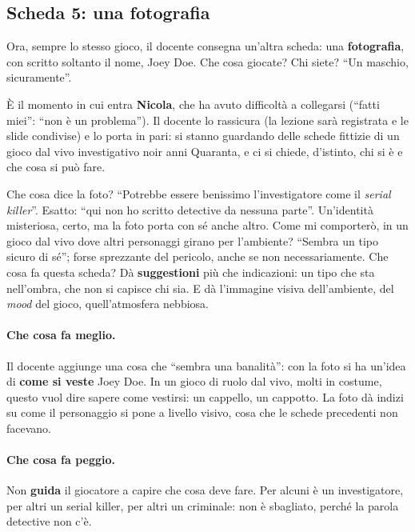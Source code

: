 \subsection{Scheda 5: una fotografia}



Ora, sempre lo stesso gioco, il docente consegna un'altra scheda: una
\textbf{fotografia}, con scritto soltanto il nome, Joey Doe. Che cosa giocate? Chi
siete? ``Un maschio, sicuramente''.

È il momento in cui entra \textbf{Nicola}, che ha avuto difficoltà a collegarsi
(``fatti miei'': ``non è un problema''). Il docente lo rassicura (la lezione sarà
registrata e le slide condivise) e lo porta in pari: si stanno guardando delle
schede fittizie di un gioco dal vivo investigativo noir anni Quaranta, e ci si
chiede, d'istinto, chi si è e che cosa si può fare.

Che cosa dice la foto? ``Potrebbe essere benissimo l'investigatore come il
\emph{serial killer}''. Esatto: ``qui non ho scritto detective da nessuna parte''.
Un'identità misteriosa, certo, ma la foto porta con sé anche altro. Come mi
comporterò, in un gioco dal vivo dove altri personaggi girano per l'ambiente? ``Sembra
un tipo sicuro di sé''; forse sprezzante del pericolo, anche se non
necessariamente. Che cosa fa questa scheda? Dà \textbf{suggestioni} più che
indicazioni: un tipo che sta nell'ombra, che non si capisce chi sia. E dà
l'immagine visiva dell'ambiente, del \emph{mood} del gioco, quell'atmosfera
nebbiosa.

\paragraph{Che cosa fa meglio.} Il docente aggiunge una cosa che ``sembra una
banalità'': con la foto si ha un'idea di \textbf{come si veste} Joey Doe. In un gioco
di ruolo dal vivo, molti in costume, questo vuol dire sapere come vestirsi: un
cappello, un cappotto. La foto dà indizi su come il personaggio si pone a livello
visivo, cosa che le schede precedenti non facevano.

\paragraph{Che cosa fa peggio.} Non \textbf{guida} il giocatore a capire che cosa
deve fare. Per alcuni è un investigatore, per altri un serial killer, per altri un
criminale: non è sbagliato, perché la parola detective non c'è.

